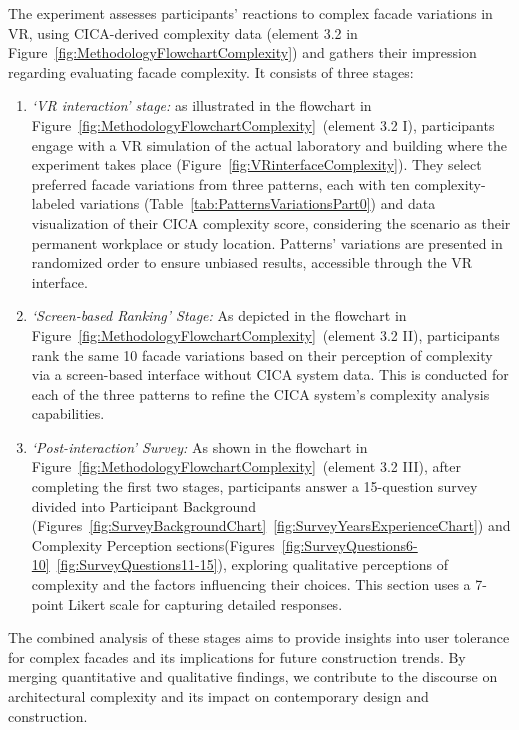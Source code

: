%    

The experiment assesses participants' reactions to complex facade variations in VR, using CICA-derived complexity data (element 3.2 in Figure~\ref{fig:MethodologyFlowchartComplexity}) and gathers their impression regarding evaluating facade complexity.
It consists of three stages:

\begin{enumerate}
    \item \textit{`VR interaction' stage:}  as illustrated in the flowchart in Figure~\ref{fig:MethodologyFlowchartComplexity}~(element 3.2 I), participants engage with a VR simulation of the actual laboratory and building where the experiment takes place (Figure~\ref{fig:VRinterfaceComplexity}). They select preferred facade variations from three patterns, each with ten complexity-labeled variations (Table~\ref{tab:PatternsVariationsPart0}) and data visualization of their CICA complexity score, considering the scenario as their permanent workplace or study location.
    Patterns' variations are presented in randomized order to ensure unbiased results, accessible through the VR interface.

    \item \textit{`Screen-based Ranking' Stage:} As depicted in the flowchart in Figure~\ref{fig:MethodologyFlowchartComplexity}~(element 3.2 II), participants rank the same 10 facade variations based on their perception of complexity via a screen-based interface without CICA system data.
    This is conducted for each of the three patterns to refine the CICA system's complexity analysis capabilities.

    \item \textit{`Post-interaction' Survey:} As shown in the flowchart in Figure~\ref{fig:MethodologyFlowchartComplexity}~(element 3.2 III), after completing the first two stages, participants answer a 15-question survey divided into Participant Background (Figures~\ref{fig:SurveyBackgroundChart}~\ref{fig:SurveyYearsExperienceChart}) and Complexity Perception sections(Figures~\ref{fig:SurveyQuestions6-10}~\ref{fig:SurveyQuestions11-15}), exploring qualitative perceptions of complexity and the factors influencing their choices.
    This section uses a 7-point Likert scale for capturing detailed responses.
\end{enumerate}


The combined analysis of these stages aims to provide insights into user tolerance for complex facades and its implications for future construction trends.
By merging quantitative and qualitative findings, we contribute to the discourse on architectural complexity and its impact on contemporary design and construction.